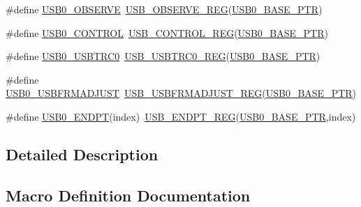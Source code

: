 \begin{DoxyCompactItemize}
\item 
\#define \hyperlink{group___u_s_b___register___accessor___macros_gae7fc760132c134248d833d94ec89635e}{U\+S\+B0\+\_\+\+O\+B\+S\+E\+R\+VE}~\hyperlink{group___u_s_b___register___accessor___macros_gacf3b928d262722e221b19407d6fd1d4b}{U\+S\+B\+\_\+\+O\+B\+S\+E\+R\+V\+E\+\_\+\+R\+EG}(\hyperlink{group___u_s_b___peripheral_ga598ff5eb20a0551af232710b3f27640a}{U\+S\+B0\+\_\+\+B\+A\+S\+E\+\_\+\+P\+TR})
\item 
\#define \hyperlink{group___u_s_b___register___accessor___macros_gaf00c1bd9c15954db30472d3273cf7ec2}{U\+S\+B0\+\_\+\+C\+O\+N\+T\+R\+OL}~\hyperlink{group___u_s_b___register___accessor___macros_gae70ee8839acefd0aeb3e0c5129b59c76}{U\+S\+B\+\_\+\+C\+O\+N\+T\+R\+O\+L\+\_\+\+R\+EG}(\hyperlink{group___u_s_b___peripheral_ga598ff5eb20a0551af232710b3f27640a}{U\+S\+B0\+\_\+\+B\+A\+S\+E\+\_\+\+P\+TR})
\item 
\#define \hyperlink{group___u_s_b___register___accessor___macros_ga05ec0dc133dcc7675dda9e96c6ed222b}{U\+S\+B0\+\_\+\+U\+S\+B\+T\+R\+C0}~\hyperlink{group___u_s_b___register___accessor___macros_gaff7c1525f5741bfe869a137149371c89}{U\+S\+B\+\_\+\+U\+S\+B\+T\+R\+C0\+\_\+\+R\+EG}(\hyperlink{group___u_s_b___peripheral_ga598ff5eb20a0551af232710b3f27640a}{U\+S\+B0\+\_\+\+B\+A\+S\+E\+\_\+\+P\+TR})
\item 
\#define \hyperlink{group___u_s_b___register___accessor___macros_ga7b5628cccd04a47b3f3bc51d01b7fc2d}{U\+S\+B0\+\_\+\+U\+S\+B\+F\+R\+M\+A\+D\+J\+U\+ST}~\hyperlink{group___u_s_b___register___accessor___macros_ga0c14a322173f3a4dbb3cc4ea025724ae}{U\+S\+B\+\_\+\+U\+S\+B\+F\+R\+M\+A\+D\+J\+U\+S\+T\+\_\+\+R\+EG}(\hyperlink{group___u_s_b___peripheral_ga598ff5eb20a0551af232710b3f27640a}{U\+S\+B0\+\_\+\+B\+A\+S\+E\+\_\+\+P\+TR})
\item 
\#define \hyperlink{group___u_s_b___register___accessor___macros_gab12df1a4de08fae1e4662a2cb4060b5e}{U\+S\+B0\+\_\+\+E\+N\+D\+PT}(index)~\hyperlink{group___u_s_b___register___accessor___macros_ga93e8b132ffc209ad3ba99ba2cbf4f990}{U\+S\+B\+\_\+\+E\+N\+D\+P\+T\+\_\+\+R\+EG}(\hyperlink{group___u_s_b___peripheral_ga598ff5eb20a0551af232710b3f27640a}{U\+S\+B0\+\_\+\+B\+A\+S\+E\+\_\+\+P\+TR},index)
\end{DoxyCompactItemize}


\subsection{Detailed Description}


\subsection{Macro Definition Documentation}
\mbox{\label{group___u_s_b___register___accessor___macros_gaff725c65f6ef8cabfafd851c6d1cb41f}} 
